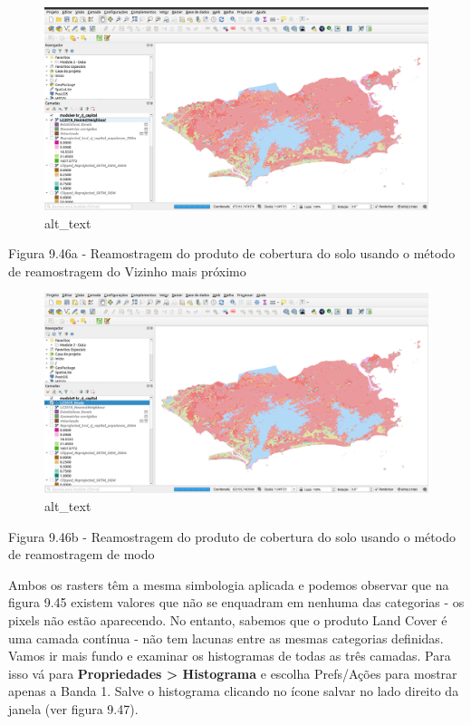 \documentclass[
  portuguese,
]{krantz}
\begin{document}
\begin{figure}
\centering
\includegraphics{media/modulo9/fig946_a.png}
\caption{alt\_text}
\end{figure}

Figura 9.46a - Reamostragem do produto de cobertura do solo usando o método de reamostragem do Vizinho mais próximo

\begin{figure}
\centering
\includegraphics{media/modulo9/fig946_b.png}
\caption{alt\_text}
\end{figure}

Figura 9.46b - Reamostragem do produto de cobertura do solo usando o método de reamostragem de modo

Ambos os rasters têm a mesma simbologia aplicada e podemos observar que na figura 9.45 existem valores que não se enquadram em nenhuma das categorias - os pixels não estão aparecendo. No entanto, sabemos que o produto Land Cover é uma camada contínua - não tem lacunas entre as mesmas categorias definidas. Vamos ir mais fundo e examinar os histogramas de todas as três camadas. Para isso vá para \textbf{Propriedades \textgreater{} Histograma} e escolha Prefs/Ações para mostrar apenas a Banda 1. Salve o histograma clicando no ícone salvar no lado direito da janela (ver figura 9.47).
\end{document}
